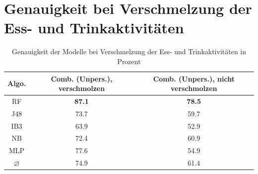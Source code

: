 \section{Genauigkeit bei Verschmelzung der Ess- und Trinkaktivitäten}
\begin{table}
\centering
\begin{tabular}{|c|c|c|}
	\hline 
	\textbf{Algo.} & \textbf{Comb. (Unpers.), verschmolzen} & \textbf{Comb. (Unpers.), nicht verschmolzen} \\ 
	\hline 
	RF & \textbf{87.1} &  \textbf{78.5} \\ 
	J48 & 73.7 &  59.7 \\ 
	IB3 & 63.9 &  52.9  \\ 
	NB & 72.4 & 60.9  \\ 
	MLP & 77.6  & 54.9 \\ 
	\hline 
	$\varnothing$ & 74.9 & 61.4  \\ 
	\hline
\end{tabular} 
\caption{Genauigkeit der Modelle bei Verschmelzung der Ess- und Trinkaktivitäten in Prozent}
\label{tab:accuracy-merge-eating}
\end{table}
